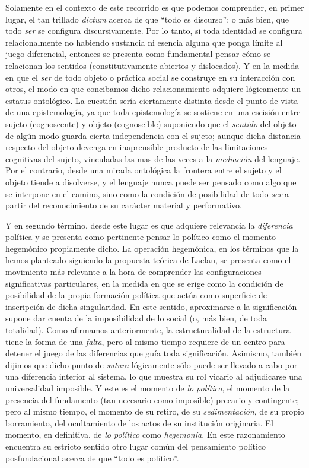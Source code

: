 \documentclass{book}
\begin{document}
Solamente en el contexto de este recorrido es que podemos comprender, en
primer lugar, el tan trillado \emph{dictum} acerca de que ``todo es
discurso''; o más bien, que todo \emph{ser} se configura
discursivamente. Por lo tanto, si toda identidad se configura
relacionalmente no habiendo sustancia ni esencia alguna que ponga límite
al juego diferencial, entonces se presenta como fundamental pensar cómo
se relacionan los sentidos (constitutivamente abiertos y dislocados). Y
en la medida en que el \emph{ser} de todo objeto o práctica social se
construye en su interacción con otros, el modo en que concibamos dicho
relacionamiento adquiere lógicamente un estatus ontológico. La cuestión
sería ciertamente distinta desde el punto de vista de una epistemología,
ya que toda epistemología se sostiene en una escisión entre sujeto
(cognoscente) y objeto (cognoscible) suponiendo que el \emph{sentido}
del objeto de algún modo guarda cierta independencia con el sujeto;
aunque dicha distancia respecto del objeto devenga en inaprensible
producto de las limitaciones cognitivas del sujeto, vinculadas las mas
de las veces a la \emph{mediación} del lenguaje. Por el contrario, desde
una mirada ontológica la frontera entre el sujeto y el objeto tiende a
disolverse, y el lenguaje nunca puede ser pensado como algo que se
interpone en el camino, sino como la condición de posibilidad de todo
\emph{ser} a partir del reconocimiento de su carácter material y
performativo.

Y en segundo término, desde este lugar es que adquiere relevancia la
\emph{diferencia} política y se presenta como pertinente pensar lo
político como el momento hegemónico propiamente dicho. La operación
hegemónica, en los términos que la hemos planteado siguiendo la
propuesta teórica de Laclau, se presenta como el movimiento más
relevante a la hora de comprender las configuraciones significativas
particulares, en la medida en que se erige como la condición de
posibilidad de la propia formación política que actúa como superficie de
inscripción de dicha singularidad. En este sentido, aproximarse a la
significación supone dar cuenta de la imposibilidad de lo social (o, más
bien, de toda totalidad). Como afirmamos anteriormente, la
estructuralidad de la estructura tiene la forma de una \emph{falta},
pero al mismo tiempo requiere de un centro para detener el juego de las
diferencias que guía toda significación. Asimismo, también dijimos que
dicho punto de \emph{sutura} lógicamente sólo puede ser llevado a cabo
por una diferencia interior al sistema, lo que muestra su rol vicario al
adjudicarse una universalidad imposible. Y este es el momento de
\emph{lo político}, el momento de la presencia del fundamento (tan
necesario como imposible) precario y contingente; pero al mismo tiempo,
el momento de su retiro, de su \emph{sedimentación}, de su propio
borramiento, del ocultamiento de los actos de su institución originaria.
El momento, en definitiva, de \emph{lo político} como \emph{hegemonía}.
En este razonamiento encuentra su estricto sentido otro lugar común del
pensamiento político posfundacional acerca de que ``todo es político''.
\end{document}
